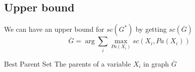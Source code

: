 \subsection{Upper bound}
	\begin{frame}
		We can have an upper bound for ${sc}( G^* )$ by getting ${sc}( \overline G )$
			\[ \overline{G} = \arg \sum_i \max_{{Pa}(X_i)} sc( X_i, {Pa}( X_i ) ) \]
		\begin{block}{Best Parent Set}
			The parents of a variable $X_i$ in graph $\overline G$
		\end{block}
	\end{frame}